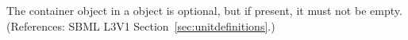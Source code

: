 \removedRule
  {The \ListOfUnits container object in a \UnitDefinition object is optional, but if present, it must not be empty.}
  {(References: SBML L3V1 Section~\ref{sec:unitdefinitions}.)}
